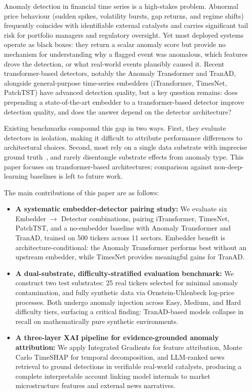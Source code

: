 \documentclass{llncs}
\begin{document}
Anomaly detection in financial time series is a high-stakes problem. Abnormal price behaviour (sudden spikes, volatility bursts, gap returns, and regime shifts) frequently coincides with identifiable external catalysts and carries significant tail risk for portfolio managers and regulatory oversight. Yet most deployed systems operate as black boxes: they return a scalar anomaly score but provide no mechanism for understanding why a flagged event was anomalous, which features drove the detection, or what real-world events plausibly caused it. Recent transformer-based detectors, notably the Anomaly Transformer and TranAD, alongside general-purpose time-series embedders (iTransformer, TimesNet, PatchTST) have advanced detection quality, but a key question remains: does prepending a state-of-the-art embedder to a transformer-based detector improve detection quality, and does the answer depend on the detector architecture?

Existing benchmarks compound this gap in two ways. First, they evaluate detectors in isolation, making it difficult to attribute performance differences to architectural choices. Second, most rely on a single data substrate with imprecise ground truth~\cite{ref14,ref4}, and rarely disentangle substrate effects from anomaly type. This paper focuses on transformer-based architectures; comparison against non-deep-learning baselines is left to future work.

The main contributions of this paper are as follows:
\begin{itemize}
    \item \textbf{A systematic embedder-detector pairing study:} We evaluate six Embedder $\rightarrow$ Detector combinations, pairing iTransformer, TimesNet, PatchTST, and a no-embedder baseline with Anomaly Transformer and TranAD, trained on 500 tickers across 11 sectors. Embedder benefit is architecture-conditional: the Anomaly Transformer performs best without an upstream embedder, while TimesNet provides meaningful gains for TranAD.
    \item \textbf{A dual-substrate, difficulty-stratified evaluation benchmark:} We construct two test substrates: 25 real tickers selected for minimal anomaly contamination, and fully synthetic data via Ornstein-Uhlenbeck log-price processes. Both undergo anomaly injection across Easy, Medium, and Hard difficulty tiers, surfacing a critical finding: TranAD-based models collapse in recall on mathematically pure synthetic environments.
    \item \textbf{A three-layer XAI pipeline for evidence-grounded anomaly attribution:} We apply Integrated Gradients for feature attribution, Monte Carlo TimeSHAP for temporal decomposition, and LLM-ranked news retrieval to ground detections in verifiable real-world catalysts, producing a complete interpretable account linking model internals to market microstructure features and external news narratives.
\end{itemize}
\end{document}

